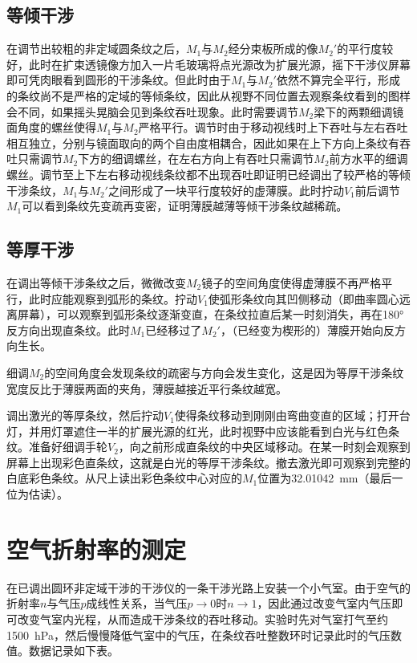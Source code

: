 \documentclass[UTF8]{ctexart}
\begin{document}
\subsection{等倾干涉}
在调节出较粗的非定域圆条纹之后，$M_1$与$M_2$经分束板所成的像$M_2'$的平行度较好，此时在扩束透镜像方加入一片毛玻璃将点光源改为扩展光源，摇下干涉仪屏幕即可凭肉眼看到圆形的干涉条纹。但此时由于$M_1$与$M_2'$依然不算完全平行，形成的条纹尚不是严格的定域的等倾条纹，因此从视野不同位置去观察条纹看到的图样会不同，如果摇头晃脑会见到条纹吞吐现象。此时需要调节$M_2$梁下的两颗细调镜面角度的螺丝使得$M_1$与$M_2$严格平行。调节时由于移动视线时上下吞吐与左右吞吐相互独立，分别与镜面取向的两个自由度相耦合，因此如果在上下方向上条纹有吞吐只需调节$M_2$下方的细调螺丝，在左右方向上有吞吐只需调节$M_2$前方水平的细调螺丝。调节至上下左右移动视线条纹都不出现吞吐即证明已经调出了较严格的等倾干涉条纹，$M_1$与$M_2'$之间形成了一块平行度较好的虚薄膜。此时拧动$V_1$前后调节$M_1$可以看到条纹先变疏再变密，证明薄膜越薄等倾干涉条纹越稀疏。
\subsection{等厚干涉}
在调出等倾干涉条纹之后，微微改变$M_2$镜子的空间角度使得虚薄膜不再严格平行，此时应能观察到弧形的条纹。拧动$V_1$使弧形条纹向其凹侧移动（即曲率圆心远离屏幕），可以观察到弧形条纹逐渐变直，在条纹拉直后某一时刻消失，再在\ang{180}反方向出现直条纹。此时$M_1$已经移过了$M_2'$，（已经变为楔形的）薄膜开始向反方向生长。

细调$M_2$的空间角度会发现条纹的疏密与方向会发生变化，这是因为等厚干涉条纹宽度反比于薄膜两面的夹角，薄膜越接近平行条纹越宽。

调出激光的等厚条纹，然后拧动$V_1$使得条纹移动到刚刚由弯曲变直的区域；打开台灯，并用灯罩遮住一半的扩展光源的红光，此时视野中应该能看到白光与红色条纹。准备好细调手轮$V_2$，向之前形成直条纹的中央区域移动。在某一时刻会观察到屏幕上出现彩色直条纹，这就是白光的等厚干涉条纹。撤去激光即可观察到完整的白底彩色条纹。从尺上读出彩色条纹中心对应的$M_1$位置为\SI{32.01042}{\mm}（最后一位为估读）。


\section{空气折射率的测定}
在已调出圆环非定域干涉的干涉仪的一条干涉光路上安装一个小气室。由于空气的折射率$n$与气压$p$成线性关系，当气压$p\rightarrow 0$时$n\rightarrow 1$，因此通过改变气室内气压即可改变气室内光程，从而造成干涉条纹的吞吐移动。实验时先对气室打气至约\SI{1500}{hPa}，然后慢慢降低气室中的气压，在条纹吞吐整数环时记录此时的气压数值。数据记录如下表。
\end{document}
